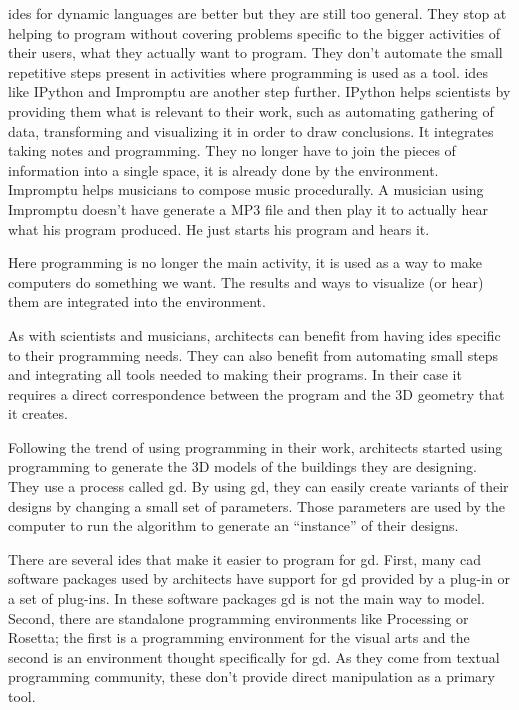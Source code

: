 \documentclass{./llncs2e/llncs}
\begin{document}
	\ac{ide}s for dynamic languages are better but they are still too general.
	They stop at helping to program without covering problems specific to the bigger activities of their users, what they actually want to program.
	They don't automate the small repetitive steps present in activities where programming is used as a tool.
	\ac{ide}s like IPython and Impromptu are another step further.
	IPython helps scientists by providing them what is relevant to their work, such as automating gathering of data, transforming and visualizing it in order to draw conclusions.
	It integrates taking notes and programming.
	They no longer have to join the pieces of information into a single space, it is already done by the environment.
	Impromptu helps musicians to compose music procedurally.
	A musician using Impromptu doesn't have generate a MP3 file and then play it to actually hear what his program produced.
	He just starts his program and hears it.

	Here programming is no longer the main activity, it is used as a way to make computers do something we want.
	The results and ways to visualize (or hear) them are integrated into the environment.

	As with scientists and musicians, architects can benefit from having \ac{ide}s specific to their programming needs.
	They can also benefit from automating small steps and integrating all tools needed to making their programs.
	In their case it requires a direct correspondence between the program and the 3D geometry that it creates.
	
	Following the trend of using programming in their work, architects started using programming to generate the 3D models of the buildings they are designing. 
	They use a process called \ac{gd}\cite{terzidis2003expressive}\cite{Maeda:2001:DN:559503}.
	By using \ac{gd}, they can easily create variants of their designs by changing a small set of parameters. 
	Those parameters are used by the computer to run the algorithm to generate an ``instance'' of their designs. \cite{Santos20144}

	There are several \ac{ide}s that make it easier to program for \ac{gd}. 
	First, many \ac{cad} software packages used by architects have support for \ac{gd} provided by a plug-in or a set of plug-ins.
	In these software packages \ac{gd} is not the main way to model.
	Second, there are standalone programming environments like Processing\cite{reas2007processing} or Rosetta\cite{de2012modern}; the first is a programming environment for the visual arts and the second is an environment thought specifically for \ac{gd}. 
	As they come from textual programming community, these don't provide direct manipulation as a primary tool.
\end{document}
